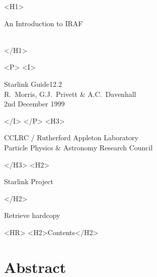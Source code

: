 \documentclass[twoside,11pt]{article}
\newcommand{\stardoccategory}  {Starlink Guide}
\newcommand{\stardocsource}    {sg\stardocnumber}
\newcommand{\stardocnumber}    {12.2}
\newcommand{\stardocauthors}   {R.~Morris, G.J.~Privett \& A.C.~Davenhall}
\newcommand{\stardocdate}      {2nd December 1999}
\newcommand{\stardoctitle}     {An Introduction to IRAF}
\newcommand{\htmladdnormallink}[2]{#1}
\newcommand{\htmladdimg}[1]{}
\newcommand{\htmlref}[2]{#1}
\newcommand{\htmladdtonavigation}[1]{}
\newcommand{\xlabel}[1]{}
\newcommand{\latexonlytoc}[0]{\tableofcontents}
\begin{document}
\begin{htmlonly}
   \xlabel{}
   \begin{rawhtml} <H1> \end{rawhtml}
      \stardoctitle\\
      \stardocversion\\
      \stardocmanual
   \begin{rawhtml} </H1> \end{rawhtml}


   \begin{rawhtml} <P> <I> \end{rawhtml}
   \stardoccategory \stardocnumber \\
   \stardocauthors \\
   \stardocdate
   \begin{rawhtml} </I> </P> <H3> \end{rawhtml}
      \htmladdnormallink{CCLRC}{http://www.cclrc.ac.uk} /
      \htmladdnormallink{Rutherford Appleton Laboratory}
                        {http://www.cclrc.ac.uk/ral} \\
      \htmladdnormallink{Particle Physics \& Astronomy Research Council}
                        {http://www.pparc.ac.uk} \\
   \begin{rawhtml} </H3> <H2> \end{rawhtml}
      \htmladdnormallink{Starlink Project}{http://star-www.rl.ac.uk/}
   \begin{rawhtml} </H2> \end{rawhtml}
   \htmladdnormallink{\htmladdimg{source.gif} Retrieve hardcopy}
      {http://star-www.rl.ac.uk/cgi-bin/hcserver?\stardocsource}\\

  \label{stardoccontents}
  \begin{rawhtml} 
    <HR>
    <H2>Contents</H2>
  \end{rawhtml}
  \newcommand{\latexonlytoc}[0]{}
  \htmladdtonavigation{\htmlref{\htmladdimg{contents_motif.gif}}
        {stardoccontents}}

  \section{\xlabel{abstract}Abstract}
\end{htmlonly}
\end{document}
